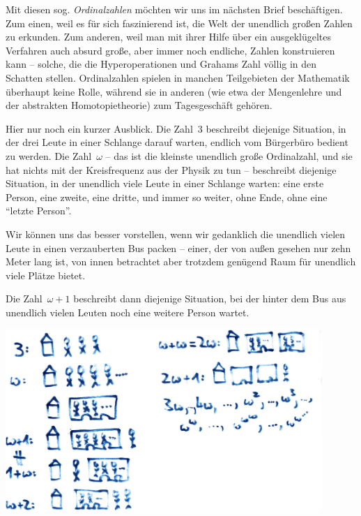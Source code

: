 \documentclass{../../zirkelblatt1718}
\theoremstyle{definition}
\theoremstyle{plain}
\theoremstyle{remark}
\begin{document}
Mit diesen sog. \emph{Ordinalzahlen} möchten wir uns im nächsten Brief
beschäftigen. Zum einen, weil es für sich faszinierend ist, die Welt der
unendlich großen Zahlen zu erkunden. Zum anderen, weil man mit ihrer Hilfe über
ein ausgeklügeltes Verfahren auch absurd große, aber immer noch endliche, Zahlen
konstruieren kann -- solche, die die Hyperoperationen und Grahams Zahl völlig
in den Schatten stellen. Ordinalzahlen spielen in manchen Teilgebieten der
Mathematik überhaupt keine Rolle, während sie in anderen (wie etwa der
Mengenlehre und der abstrakten Homotopietheorie) zum Tagesgeschäft gehören.

Hier nur noch ein kurzer Ausblick. Die Zahl~3 beschreibt diejenige Situation,
in der drei Leute in einer Schlange darauf warten, endlich vom Bürgerbüro
bedient zu werden. Die Zahl~$\omega$ -- das ist die kleinste unendlich große
Ordinalzahl, und sie hat nichts mit der Kreisfrequenz aus der Physik zu tun --
beschreibt diejenige Situation, in der unendlich viele Leute in einer Schlange
warten: eine erste Person, eine zweite, eine dritte, und immer so weiter,
ohne Ende, ohne eine "`letzte Person"'.

Wir können uns das besser vorstellen, wenn wir gedanklich die unendlich vielen
Leute in einen verzauberten Bus packen -- einer, der von außen gesehen nur zehn
Meter lang ist, von innen betrachtet aber trotzdem genügend Raum für unendlich
viele Plätze bietet.

Die Zahl~$\omega + 1$ beschreibt dann diejenige Situation, bei der hinter dem
Bus aus unendlich vielen Leuten noch eine weitere Person wartet.

\begin{center}
  \includegraphics[width=0.9\textwidth]{ordinal-intuition}
\end{center}
\end{document}
